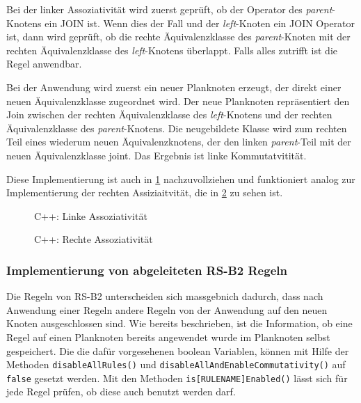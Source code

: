 Bei der linker Assoziativität wird zuerst geprüft, ob der Operator des \textit{parent}-Knotens ein JOIN ist. Wenn dies der Fall und der \textit{left}-Knoten ein JOIN Operator ist, dann wird geprüft, ob die rechte Äquivalenzklasse des \textit{parent}-Knoten mit der rechten Äquivalenzklasse des \textit{left}-Knotens überlappt. Falls alles zutrifft ist die Regel anwendbar.

Bei der Anwendung wird zuerst ein neuer Planknoten erzeugt, der direkt einer neuen Äquivalenzklasse zugeordnet wird. Der neue Planknoten repräsentiert den Join zwischen der rechten Äquivalenzklasse des \textit{left}-Knotens und der rechten Äquivalenzklasse des \textit{parent}-Knotens. Die neugebildete Klasse wird zum rechten Teil eines wiederum neuen Äquivalenzknotens, der den linken \textit{parent}-Teil mit der neuen Äquivalenzklasse joint. Das Ergebnis ist linke Kommutatvitität.

Diese Implementierung ist auch in \ref{LeftAssociativityCode} nachzuvollziehen und funktioniert analog zur Implementierung der rechten Assiziaitvität, die in \ref{RightAssociativityCode} zu sehen ist.


\begin{figure}[ht]

\caption{C++: Linke Assoziativität}
\label{LeftAssociativityCode}
\end{figure}

\begin{figure}[ht]

\caption{C++: Rechte Assoziativität}
\label{RightAssociativityCode}
\end{figure}




\subsubsection{Implementierung von abgeleiteten RS-B2 Regeln}

Die Regeln von RS-B2 unterscheiden sich massgebnich dadurch, dass nach Anwendung einer Regeln andere Regeln von der Anwendung auf den neuen Knoten ausgeschlossen sind. Wie bereits beschrieben, ist die Information, ob eine Regel auf einen Planknoten bereits angewendet wurde im Planknoten selbst gespeichert. Die die dafür vorgesehenen boolean Variablen, können mit Hilfe der Methoden \texttt{disable\-All\-Rules()} und \texttt{disable\-All\-And\-Enable\-Commutativity()} auf \texttt{false} gesetzt werden. Mit den Methoden \texttt{is[RULENAME]Enabled()} lässt sich für jede Regel prüfen, ob diese auch benutzt werden darf.

